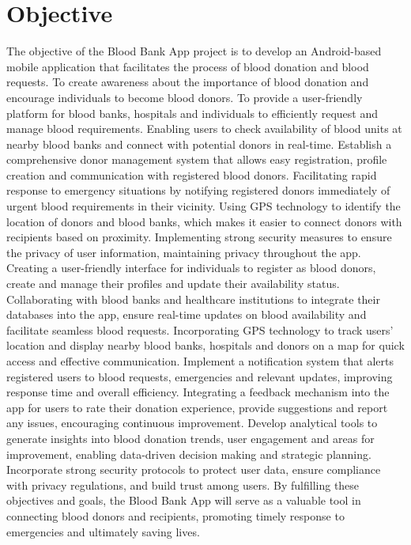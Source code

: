 \documentclass{article}
\begin{document}
\section{Objective}
The objective of the Blood Bank App project is to develop an Android-based mobile application
that facilitates the process of blood donation and blood requests. To create awareness about the
importance of blood donation and encourage individuals to become blood donors. To provide a
user-friendly platform for blood banks, hospitals and individuals to efficiently request and
manage blood requirements. Enabling users to check availability of blood units at nearby blood
banks and connect with potential donors in real-time. Establish a comprehensive donor
management system that allows easy registration, profile creation and communication with
registered blood donors. Facilitating rapid response to emergency situations by notifying
registered donors immediately of urgent blood requirements in their vicinity. Using GPS
technology to identify the location of donors and blood banks, which makes it easier to connect
donors with recipients based on proximity. Implementing strong security measures to ensure the
privacy of user information, maintaining privacy throughout the app.
Creating a user-friendly interface for individuals to register as blood donors, create and manage
their profiles and update their availability status. Collaborating with blood banks and healthcare
institutions to integrate their databases into the app, ensure real-time updates on blood
availability and facilitate seamless blood requests. Incorporating GPS technology to track users'
location and display nearby blood banks, hospitals and donors on a map for quick access and
effective communication. Implement a notification system that alerts registered users to blood
requests, emergencies and relevant updates, improving response time and overall efficiency.
Integrating a feedback mechanism into the app for users to rate their donation experience,
provide suggestions and report any issues, encouraging continuous improvement. Develop
analytical tools to generate insights into blood donation trends, user engagement and areas for
improvement, enabling data-driven decision making and strategic planning. Incorporate strong
security protocols to protect user data, ensure compliance with privacy regulations, and build
trust among users. By fulfilling these objectives and goals, the Blood Bank App will serve as a
valuable tool in connecting blood donors and recipients, promoting timely response to
emergencies and ultimately saving lives.
\end{document}
